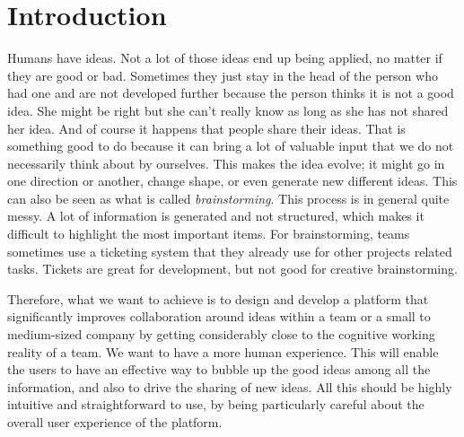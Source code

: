 \documentclass[a4paper,12pt, oneside]{article}
\newenvironment{acknowledgments}
  {\renewcommand{\abstractname}{Acknowledgments}
   \begin{abstract}}
  {\end{abstract}}
\begin{document}



\vspace*{5cm}
\begin{acknowledgments}
    \lipsum[1] %
\end{acknowledgments}
\newpage

\vspace*{5cm}
\begin{abstract}
    \lipsum[1] %
\end{abstract}
\newpage

\tableofcontents
\newpage

\setcounter{page}{1}


\section{Introduction}
Humans have ideas. Not a lot of those ideas end up being applied, no matter if they are good or bad.
Sometimes they just stay in the head of the person who had one and are not developed further because the person thinks it is not a good idea.
She might be right but she can't really know as long as she has not shared her idea. And of course it happens that people share their ideas.
That is something good to do because it can bring a lot of valuable input that we do not necessarily think about by ourselves.
This makes the idea evolve; it might go in one direction or another, change shape, or even generate new different ideas.
This can also be seen as what is called \emph{brainstorming}. This process is in general quite messy.
A lot of information is generated and not structured, which makes it difficult to highlight the most important items.
For brainstorming, teams sometimes use a ticketing system that they already use for other projects related tasks.
Tickets are great for development, but not good for creative brainstorming.

Therefore, what we want to achieve is to design and develop a platform that significantly improves collaboration around ideas within a team or a small to medium-sized company by getting considerably close to the cognitive working reality of a team.
We want to have a more human experience.
This will enable the users to have an effective way to bubble up the good ideas among all the information, and also to drive the sharing of new ideas.
All this should be highly intuitive and straightforward to use, by being particularly careful about the overall user experience of the platform.
\end{document}
